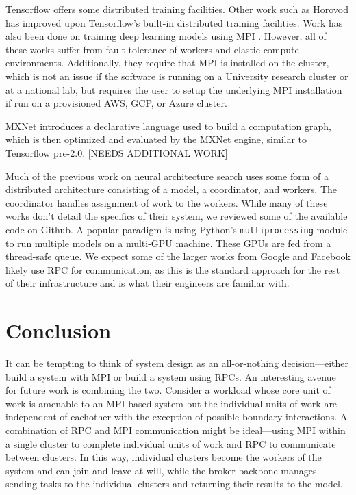 \documentclass[conference]{IEEEtran}
\begin{document}
Tensorflow \cite{tensorflow2015-whitepaper} offers some distributed training
facilities. Other work such as Horovod \cite{DBLP:journals/corr/abs-1802-05799}
has improved upon Tensorflow's built-in distributed training facilities. Work
has also been done on training deep learning models using MPI
\cite{pmlr-v28-coates13, DBLP:journals/corr/VishnuSD16}. However, all of these
works suffer from fault tolerance of workers and elastic compute
environments. Additionally, they require that MPI is installed on the cluster,
which is not an issue if the software is running on a University research
cluster or at a national lab, but requires the user to setup the underlying MPI
installation if run on a provisioned AWS, GCP, or Azure cluster.

MXNet \cite{DBLP:journals/corr/ChenLLLWWXXZZ15} introduces a declarative language
used to build a computation graph, which is then optimized and evaluated by the
MXNet engine, similar to Tensorflow pre-2.0. [NEEDS ADDITIONAL WORK]

Much of the previous work on neural architecture search uses some form of a
distributed architecture consisting of a model, a coordinator, and workers. The
coordinator handles assignment of work to the workers. While many of these works
don't detail the specifics of their system, we reviewed some of the available
code on Github. A popular paradigm is using Python's \texttt{multiprocessing}
module to run multiple models on a multi-GPU machine. These GPUs are fed from a
thread-safe queue. We expect some of the larger works from Google and Facebook
likely use RPC for communication, as this is the standard approach for the rest
of their infrastructure and is what their engineers are familiar with.

\section{Conclusion}
It can be tempting to think of system design as an all-or-nothing
decision---either build a system with MPI or build a system using RPCs. An
interesting avenue for future work is combining the two. Consider a workload
whose core unit of work is amenable to an MPI-based system but the individual
units of work are independent of eachother with the exception of possible
boundary interactions. A combination of RPC and MPI communication might be
ideal---using MPI within a single cluster to complete individual units of work
and RPC to communicate between clusters. In this way, individual clusters become
the workers of the system and can join and leave at will, while the broker
backbone manages sending tasks to the individual clusters and returning their
results to the model.



\end{document}
